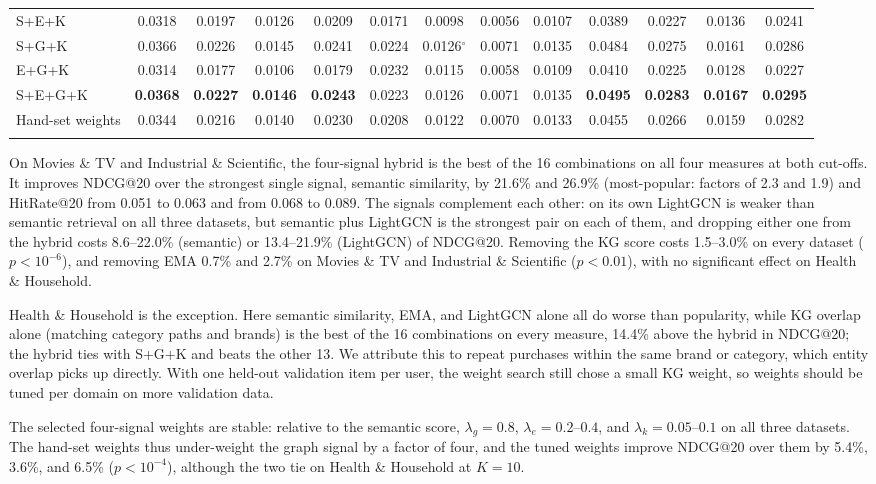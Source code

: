 \documentclass[3p,times,procedia]{elsarticle}
\begin{document}
\begin{table}[!ht]
\begin{tabular*}{\hsize}{@{\extracolsep{\fill}}lcccccccccccc@{}}
S+E+K & 0.0318 & 0.0197 & 0.0126 & 0.0209 & 0.0171 & 0.0098 & 0.0056 & 0.0107 & 0.0389 & 0.0227 & 0.0136 & 0.0241 \\
S+G+K & 0.0366 & 0.0226 & 0.0145 & 0.0241 & 0.0224 & 0.0126$^{\circ}$ & 0.0071 & 0.0135 & 0.0484 & 0.0275 & 0.0161 & 0.0286 \\
E+G+K & 0.0314 & 0.0177 & 0.0106 & 0.0179 & 0.0232 & 0.0115 & 0.0058 & 0.0109 & 0.0410 & 0.0225 & 0.0128 & 0.0227 \\
\colrule
S+E+G+K & \textbf{0.0368} & \textbf{0.0227} & \textbf{0.0146} & \textbf{0.0243} & 0.0223 & 0.0126 & 0.0071 & 0.0135 & \textbf{0.0495} & \textbf{0.0283} & \textbf{0.0167} & \textbf{0.0295} \\
\colrule
Hand-set weights & 0.0344 & 0.0216 & 0.0140 & 0.0230 & 0.0208 & 0.0122 & 0.0070 & 0.0133 & 0.0455 & 0.0266 & 0.0159 & 0.0282 \\
\botrule
\end{tabular*}
\end{table}

On Movies \& TV and Industrial \& Scientific, the four-signal hybrid is the best of the 16 combinations on all four measures at both cut-offs. It improves NDCG@20 over the strongest single signal, semantic similarity, by 21.6\% and 26.9\% (most-popular: factors of 2.3 and 1.9) and HitRate@20 from 0.051 to 0.063 and from 0.068 to 0.089. The signals complement each other: on its own LightGCN is weaker than semantic retrieval on all three datasets, but semantic plus LightGCN is the strongest pair on each of them, and dropping either one from the hybrid costs 8.6--22.0\% (semantic) or 13.4--21.9\% (LightGCN) of NDCG@20. Removing the KG score costs 1.5--3.0\% on every dataset ($p<10^{-6}$), and removing EMA 0.7\% and 2.7\% on Movies \& TV and Industrial \& Scientific ($p<0.01$), with no significant effect on Health \& Household.

Health \& Household is the exception. Here semantic similarity, EMA, and LightGCN alone all do worse than popularity, while KG overlap alone (matching category paths and brands) is the best of the 16 combinations on every measure, 14.4\% above the hybrid in NDCG@20; the hybrid ties with S+G+K and beats the other 13. We attribute this to repeat purchases within the same brand or category, which entity overlap picks up directly. With one held-out validation item per user, the weight search still chose a small KG weight, so weights should be tuned per domain on more validation data.

The selected four-signal weights are stable: relative to the semantic score, $\lambda_g=0.8$, $\lambda_e=0.2$--$0.4$, and $\lambda_k=0.05$--$0.1$ on all three datasets. The hand-set weights thus under-weight the graph signal by a factor of four, and the tuned weights improve NDCG@20 over them by 5.4\%, 3.6\%, and 6.5\% ($p<10^{-4}$), although the two tie on Health \& Household at $K=10$.
\end{document}
